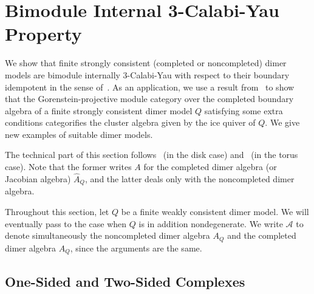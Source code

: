 \documentclass{article}
\theoremstyle{definition}
\newcommand{\A}{{\mathcal A}}
\begin{document}
\section{Bimodule Internal 3-Calabi-Yau Property}
\label{sec:3CY}\label{sec:3cy}

We show that finite strongly consistent (completed or noncompleted) dimer models are bimodule internally 3-Calabi-Yau with respect to their boundary idempotent in the sense of~\cite{XPressland2015}. As an application, we use a result from~\cite{AIRX} to show that the Gorenstein-projective module category over the completed boundary algebra of a finite strongly consistent dimer model $Q$ satisfying some extra conditions categorifies the cluster algebra given by the ice quiver of $Q$. We give new examples of suitable dimer models.

The technical part of this section follows~\cite[\S3]{XPressland2019} (in the disk case) and~\cite[\S7]{XBroomhead2009} (in the torus case).
Note that the former writes $A$ for the completed dimer algebra (or Jacobian algebra) $\widehat A_Q$, and the latter deals only with the noncompleted dimer algebra. 

Throughout this section, let $Q$ be a finite weakly consistent dimer model. We will eventually pass to the case when $Q$ is in addition nondegenerate. We write $\A$ to denote simultaneously the noncompleted dimer algebra $A_Q$ and the completed dimer algebra $\widehat A_Q$, since the arguments are the same.

\subsection{One-Sided and Two-Sided Complexes}
\end{document}
